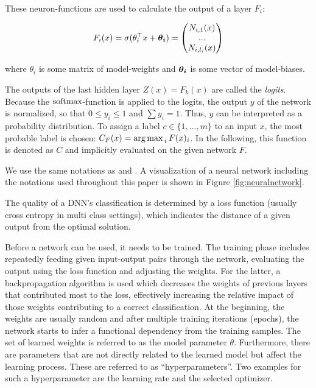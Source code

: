 These neuron-functions are used to calculate the output of a layer $F_i$:

\begin{equation*}
F_i(x) = \sigma(\theta_i^\top x + \boldsymbol{\theta_i}) = \begin{pmatrix}
N_{i,1}(x)\\...\\N_{i,l_i}(x)
\end{pmatrix}
\end{equation*}

where $\theta_i$ is some matrix of model-weights and $\boldsymbol{\theta_i}$ is some vector of model-biases.

The outputs of the last hidden layer $Z(x) = F_k(x)$ are called the \emph{logits}. Because the $\operatorname{softmax}$-function is applied to the logits, the output $y$ of the network is normalized, so that $0 \leq y_i \leq 1$ and $\sum y_i = 1$. Thus, $y$ can be interpreted as a probability distribution. To assign a label $c \in \{1,...,m\}$ to an input $x$, the most probable label is chosen: $C_F(x) = \operatorname*{arg\,max\,}_i F(x)_i$. In the following, this function is denoted as $C$ and implicitly evaluated on the given network $F$.

We use the same notations as \citet{carlini2017towards} and \citet{papernot2016distillation}. A visualization of a neural network including the notations used throughout this paper is shown in Figure \ref{fig:neuralnetwork}.

The quality of a DNN's classification is determined by a loss function (usually cross entropy in multi class settings), which indicates the distance of a given output from the optimal solution.

Before a network can be used, it needs to be trained.
The training phase includes repeatedly feeding given input-output pairs through the network, evaluating the output using the loss function and adjusting the weights.
For the latter, a backpropagation algorithm is used which decreases the weights of previous layers that contributed most to the loss, effectively increasing the relative impact of those weights contributing to a correct classification.
At the beginning, the weights are usually random and after multiple training iterations (epochs), the network starts to infer a functional dependency from the training samples.
The set of learned weights is referred to as the model parameter $\theta$.
Furthermore, there are parameters that are not directly related to the learned model but affect the learning process.
These are referred to as \enquote{hyperparameters}.
Two examples for such a hyperparameter are the learning rate and the selected optimizer.

